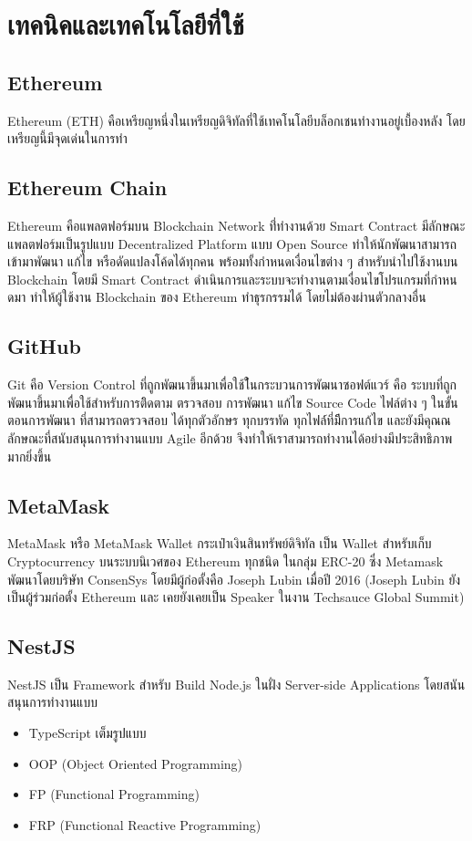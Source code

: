 \documentclass[12pt,oneside,openright,a4paper]{cpe-thai-project}
\begin{document}
\section{เทคนิคและเทคโนโลยีที่ใช้}
\subsection{Ethereum} 
\tab Ethereum (ETH) คือเหรียญหนึ่งในเหรียญดิจิทัลที่ใช้เทคโนโลยีบล็อกเชนทำงานอยู่เบื้องหลัง โดยเหรียญนี้มีจุดเด่นในการทำ
\subsection{Ethereum Chain} 
\tab Ethereum คือแพลตฟอร์มบน Blockchain Network ที่่ทํางานด้วย Smart Contract มีลักษณะแพลตฟอร์มเป็นรูปแบบ Decentralized Platform แบบ Open Source ทําให้นักพัฒนาสามารถเข้ามาพัฒนา แก้ไข หรือดัดแปลงโค้ดได้ทุกคน พร้อมทั้งกําหนดเงื่อนไขต่าง ๆ สําหรับนําไปใช้งานบน Blockchain โดยมี Smart Contract ดําเนินการและระบบจะทํางานตามเงื่อนไขโปรแกรมที่กําหนดมา ทําให้ผู้ใช้งาน Blockchain ของ Ethereum ทําธุรกรรมได้ โดยไม่ต้องผ่านตัวกลางอื่น
\subsection{GitHub}
\tab Git คือ Version Control ที่ถูกพัฒนาขึ้นมาเพื่อใช้ใ้นกระบวนการพัฒนาซอฟต์แวร์ คือ ระบบที่ถูกพัฒนาขึ้นมาเพื่อใช้สำหรับการติิดตาม ตรวจสอบ การพัฒนา แก้ไข Source Code ไฟล์ต่าง ๆ ในขั้นตอนการพัฒนา ที่สามารถตรวจสอบ ได้ทุกตัวอักษร ทุกบรรทัด ทุกไฟล์์ที่มีีการแก้ไข และยังมีคุณณลักษณะที่สนับสนุนการทำงานแบบ Agile อีกด้วย จึงทำให้เราสามารถทำงานได้อย่างมีประสิทธิภาพมากยิ่งขึ้น
\subsection{MetaMask}
\tab MetaMask หรือ MetaMask Wallet กระเป๋าเงินสินทรัพย์ดิจิทัล เป็น Wallet สำหรับเก็บ Cryptocurrency บนระบบนิเวศของ Ethereum ทุกชนิด ในกลุ่ม ERC-20 ซึ่ง Metamask พัฒนาโดยบริษัท ConsenSys โดยมีผู้ก่อตั้งคือ Joseph Lubin เมื่อปี 2016 (Joseph Lubin ยังเป็นผู้ร่วมก่อตั้ง Ethereum และ เคยยังเคยเป็น Speaker ในงาน Techsauce Global Summit)
\subsection{NestJS}
\tab NestJS เป็น Framework สำหรับ Build Node.js ในฝั่ง Server-side Applications โดยสนันสนุนการทำงานแบบ

	\begin{itemize}[leftmargin=0pt,itemindent=2.5cm]
		\item TypeScript เต็มรูปแบบ
		\item OOP (Object Oriented Programming)
		\item FP (Functional Programming)
		\item FRP (Functional Reactive Programming)
	\end{itemize}
\end{document}
